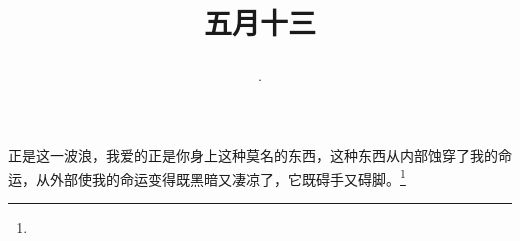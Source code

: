 \title{\date[d=18,m=6,y=2024][year:cn-y,年,month:cn,day:cn,日,·,weekday]·五月十三 }
正是这一波浪，我爱的正是你身上这种莫名的东西，这种东西从内部蚀穿了我的命运，从外部使我的命运变得既黑暗又凄凉了，它既碍手又碍脚。\footnote{ }

